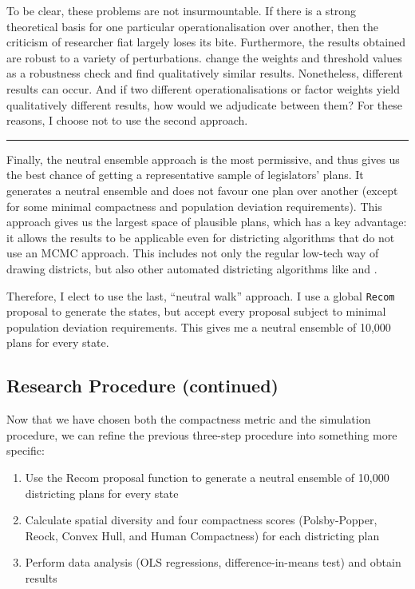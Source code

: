 \documentclass[]{article}
\providecommand{\tightlist}{%
  \setlength{\itemsep}{0pt}\setlength{\parskip}{0pt}}
\begin{document}
To be clear, these problems are not insurmountable. If there is a strong
theoretical basis for one particular operationalisation over another,
then the criticism of researcher fiat largely loses its bite.
Furthermore, the results obtained are robust to a variety of
perturbations. \cite{h2018} change the weights and threshold values as a
robustness check and find qualitatively similar results. Nonetheless,
different results can occur. And if two different operationalisations or
factor weights yield qualitatively different results, how would we
adjudicate between them? For these reasons, I choose not to use the
second approach.

\begin{center}\rule{0.5\linewidth}{\linethickness}\end{center}

Finally, the neutral ensemble approach is the most permissive, and thus
gives us the best chance of getting a representative sample of
legislators' plans. It generates a neutral ensemble and does not favour
one plan over another (except for some minimal compactness and
population deviation requirements). This approach gives us the largest
space of plausible plans, which has a key advantage: it allows the
results to be applicable even for districting algorithms that do not use
an MCMC approach. This includes not only the regular low-tech way of
drawing districts, but also other automated districting algorithms like
\cite{mm2018} and \cite{lf2019}.

Therefore, I elect to use the last, ``neutral walk'' approach. I use a
global \texttt{Recom} proposal to generate the states, but accept every
proposal subject to minimal population deviation requirements. This
gives me a neutral ensemble of 10,000 plans for every state.

\hypertarget{research-procedure-continued}{%
\subsection{Research Procedure
(continued)}\label{research-procedure-continued}}

Now that we have chosen both the compactness metric and the simulation
procedure, we can refine the previous three-step procedure into
something more specific:

\begin{enumerate}
\def\labelenumi{\arabic{enumi}.}
\tightlist
\item
  Use the Recom proposal function to generate a neutral ensemble of
  10,000 districting plans for every state
\item
  Calculate spatial diversity and four compactness scores
  (Polsby-Popper, Reock, Convex Hull, and Human Compactness) for each
  districting plan
\item
  Perform data analysis (OLS regressions, difference-in-means test) and
  obtain results
\end{enumerate}
\end{document}
